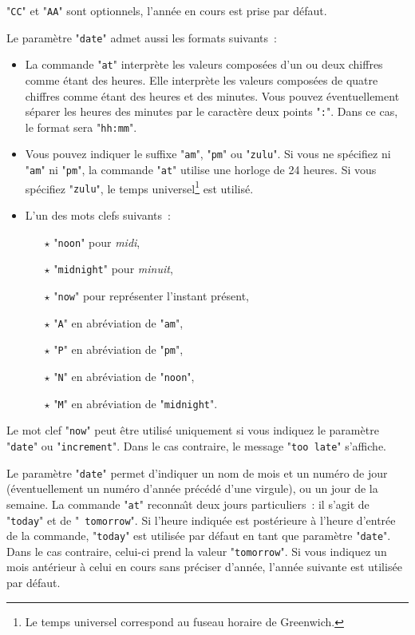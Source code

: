 "{\tt CC}" et "{\tt AA}" sont optionnels, l'ann{\'e}e en cours est prise par d{\'e}faut.

Le param{\`e}tre "{\tt date}" admet aussi les formats suivants~:
\begin{itemize}
	\item	La commande "{\tt at}" interpr{\`e}te les valeurs compos{\'e}es d'un ou deux chiffres
			comme {\'e}tant des heures. Elle interpr{\`e}te les valeurs compos{\'e}es de quatre chiffres
			comme {\'e}tant des heures et des minutes. Vous pouvez {\'e}ventuellement s{\'e}parer les heures
			des minutes par le caract{\`e}re deux points "{\tt :}". Dans ce cas, le format sera
			"{\tt hh:mm}".
	\item	Vous pouvez indiquer le suffixe "{\tt am}", "{\tt pm}" ou "{\tt zulu}".
			Si vous ne sp{\'e}cifiez ni "{\tt am}" ni "{\tt pm}", la commande "{\tt at}"
			utilise une horloge de 24 heures. Si vous sp{\'e}cifiez "{\tt zulu}", le temps
			universel\footnote{Le temps universel correspond au fuseau horaire de Greenwich.}
			est utilis{\'e}.
	\item	L'un des mots clefs suivants~:
		\begin{itemize}
			\item[$\star$]	"{\tt noon}" pour {\sl midi},
			\item[$\star$]	"{\tt midnight}" pour {\sl minuit},
			\item[$\star$]	"{\tt now}" pour repr{\'e}senter l'instant pr{\'e}sent,
			\item[$\star$]	"{\tt A}" en abr{\'e}viation de "{\tt am}",
			\item[$\star$]	"{\tt P}" en abr{\'e}viation de "{\tt pm}",
			\item[$\star$]	"{\tt N}" en abr{\'e}viation de "{\tt noon}",
			\item[$\star$]	"{\tt M}" en abr{\'e}viation de "{\tt midnight}".
		\end{itemize}
\end{itemize}

\begin{remarque}
	Le mot clef "{\tt now}" peut {\^e}tre utilis{\'e} uniquement si vous indiquez le param{\`e}tre
	"{\tt date}" ou "{\tt increment}". Dans le cas contraire, le message
	"{\tt too late}" s'affiche.
\end{remarque}

Le param{\`e}tre "{\tt date}" permet d'indiquer un nom de mois et un
num{\'e}ro de jour ({\'e}ventuellement un num{\'e}ro d'ann{\'e}e pr{\'e}c{\'e}d{\'e} d'une virgule),
ou un jour de la semaine. La commande "{\tt at}" reconna{\^\i}t deux
jours particuliers~: il s'agit de "{\tt today}" et de "{\tt
tomorrow}". Si l'heure indiqu{\'e}e est post{\'e}rieure {\`a} l'heure d'entr{\'e}e de
la commande, "{\tt today}" est utilis{\'e}e par d{\'e}faut en tant que
param{\`e}tre "{\tt date}". Dans le cas contraire, celui-ci prend la
valeur "{\tt tomorrow}". Si vous indiquez un mois ant{\'e}rieur {\`a} celui
en cours sans pr{\'e}ciser d'ann{\'e}e, l'ann{\'e}e suivante est utilis{\'e}e par
d{\'e}faut.

